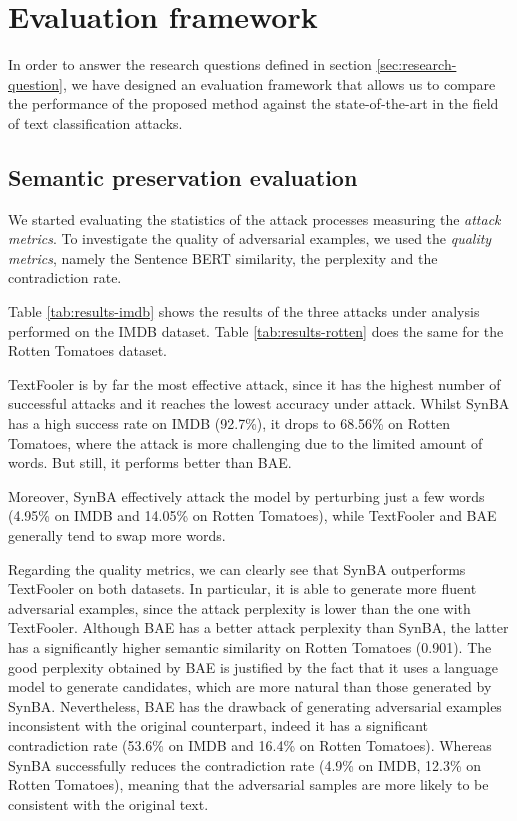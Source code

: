 \section{Evaluation framework}\label{sec:evaluation-framework}

In order to answer the research questions defined in section \ref{sec:research-question},
we have designed an evaluation framework that allows us to compare the performance of the proposed method against the state-of-the-art in the field of text classification attacks.


\subsection{Semantic preservation evaluation}\label{subsec:qualitative-evaluation}

We started evaluating the statistics of the attack processes measuring the \emph{attack metrics}.
To investigate the quality of adversarial examples, we used the \emph{quality metrics}, namely the Sentence BERT similarity, the perplexity and the contradiction rate.

Table \ref{tab:results-imdb} shows the results of the three attacks under analysis performed on the IMDB dataset.
Table \ref{tab:results-rotten} does the same for the Rotten Tomatoes dataset.

TextFooler is by far the most effective attack, since it has the highest number of successful attacks and it reaches the lowest accuracy under attack.
Whilst SynBA has a high success rate on IMDB (92.7\%), it drops to 68.56\% on Rotten Tomatoes, where the attack is more challenging due to the limited amount of words.
But still, it performs better than BAE.

Moreover, SynBA effectively attack the model by perturbing just a few words (4.95\% on IMDB and 14.05\% on Rotten Tomatoes), while TextFooler and BAE generally tend to swap more words.

Regarding the quality metrics, we can clearly see that SynBA outperforms TextFooler on both datasets. 
In particular, it is able to generate more fluent adversarial examples, since the attack perplexity is lower than the one with TextFooler. 
Although BAE has a better attack perplexity than SynBA, the latter has a significantly higher semantic similarity on Rotten Tomatoes (0.901).
The good perplexity obtained by BAE is justified by the fact that it uses a language model to generate candidates, which are more natural than those generated by SynBA.
Nevertheless, BAE has the drawback of generating adversarial examples inconsistent with the original counterpart, indeed it has a significant contradiction rate (53.6\% on IMDB and 16.4\% on Rotten Tomatoes).
Whereas SynBA successfully reduces the contradiction rate (4.9\% on IMDB, 12.3\% on Rotten Tomatoes), meaning that the adversarial samples are more likely to be consistent with the original text.

